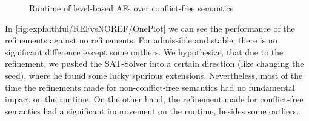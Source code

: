 \begin{figure}[H]
    \centering
    \caption{Runtime of level-based AFs over conflict-free semantics}
    \label{fig:expfaithful/REFvsNOREF/level-based}
\end{figure}

In \cref{fig:expfaithful/REFvsNOREF/OnePlot} we can see the performance of the refinements against no refinements. For admissible and stable, there is no significant difference except some outliers. We hypothesize, that due to the refinement, we pushed the SAT-Solver into a certain direction (like changing the seed), where he found some lucky spurious extensions. Nevertheless, most of the time the refinements made for non-conflict-free semantics had no fundamental impact on the runtime. On the other hand, the refinement made for conflict-free semantics had a significant improvement on the runtime, besides some outliers.

